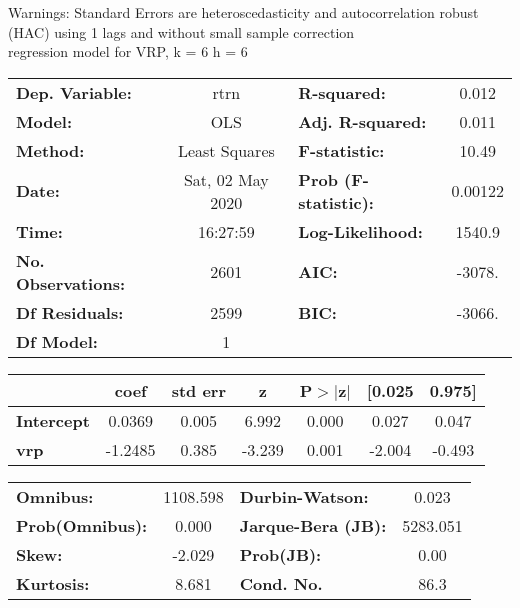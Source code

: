 Warnings: \newline
 [1] Standard Errors are heteroscedasticity and autocorrelation robust (HAC) using 1 lags and without small sample correction\\ 

regression model for VRP, k = 6 h = 6\begin{center}
\begin{tabular}{lclc}
\toprule
\textbf{Dep. Variable:}    &       rtrn       & \textbf{  R-squared:         } &     0.012   \\
\textbf{Model:}            &       OLS        & \textbf{  Adj. R-squared:    } &     0.011   \\
\textbf{Method:}           &  Least Squares   & \textbf{  F-statistic:       } &     10.49   \\
\textbf{Date:}             & Sat, 02 May 2020 & \textbf{  Prob (F-statistic):} &  0.00122    \\
\textbf{Time:}             &     16:27:59     & \textbf{  Log-Likelihood:    } &    1540.9   \\
\textbf{No. Observations:} &        2601      & \textbf{  AIC:               } &    -3078.   \\
\textbf{Df Residuals:}     &        2599      & \textbf{  BIC:               } &    -3066.   \\
\textbf{Df Model:}         &           1      & \textbf{                     } &             \\
\bottomrule
\end{tabular}
\begin{tabular}{lcccccc}
                   & \textbf{coef} & \textbf{std err} & \textbf{z} & \textbf{P$> |$z$|$} & \textbf{[0.025} & \textbf{0.975]}  \\
\midrule
\textbf{Intercept} &       0.0369  &        0.005     &     6.992  &         0.000        &        0.027    &        0.047     \\
\textbf{vrp}       &      -1.2485  &        0.385     &    -3.239  &         0.001        &       -2.004    &       -0.493     \\
\bottomrule
\end{tabular}
\begin{tabular}{lclc}
\textbf{Omnibus:}       & 1108.598 & \textbf{  Durbin-Watson:     } &    0.023  \\
\textbf{Prob(Omnibus):} &   0.000  & \textbf{  Jarque-Bera (JB):  } & 5283.051  \\
\textbf{Skew:}          &  -2.029  & \textbf{  Prob(JB):          } &     0.00  \\
\textbf{Kurtosis:}      &   8.681  & \textbf{  Cond. No.          } &     86.3  \\
\bottomrule
\end{tabular}
\end{center}

